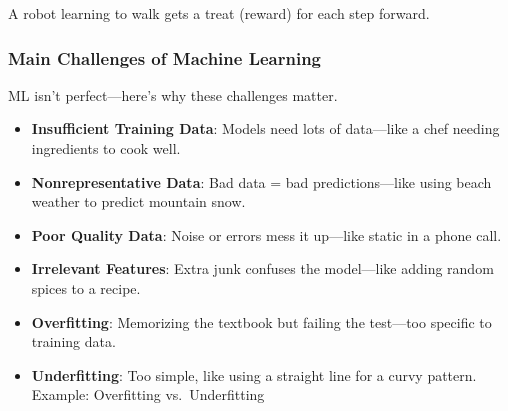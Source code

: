 \documentclass[
  letterpaper,
  DIV=11,
  numbers=noendperiod]{scrreprt}
\providecommand{\tightlist}{%
  \setlength{\itemsep}{0pt}\setlength{\parskip}{0pt}}\usepackage{longtable,booktabs,array}
\begin{document}
A robot learning to walk gets a treat (reward) for each step forward.

\subsubsection{Main Challenges of Machine
Learning}\label{main-challenges-of-machine-learning}

ML isn't perfect---here's why these challenges matter.

\begin{itemize}
\tightlist
\item
  \textbf{Insufficient Training Data}: Models need lots of data---like a
  chef needing ingredients to cook well.
\item
  \textbf{Nonrepresentative Data}: Bad data = bad predictions---like
  using beach weather to predict mountain snow.
\item
  \textbf{Poor Quality Data}: Noise or errors mess it up---like static
  in a phone call.
\item
  \textbf{Irrelevant Features}: Extra junk confuses the model---like
  adding random spices to a recipe.
\item
  \textbf{Overfitting}: Memorizing the textbook but failing the
  test---too specific to training data.
\item
  \textbf{Underfitting}: Too simple, like using a straight line for a
  curvy pattern. Example: Overfitting vs.~Underfitting
\end{itemize}
\end{document}
